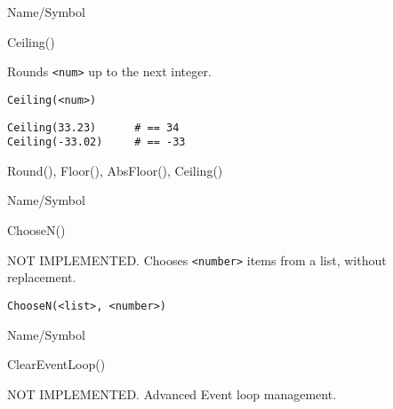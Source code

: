 \rl




\begin{desc}{Name/Symbol}
\item[Name/Symbol]  	Ceiling()

\item[Description] 	Rounds \verb+<num>+ up to the next integer.

\item[Usage]
\begin{verbatim}
Ceiling(<num>)
\end{verbatim}

\item[Example] 
\begin{verbatim}
Ceiling(33.23)  	# == 34
Ceiling(-33.02) 	# == -33
\end{verbatim}

\item[See Also]     	Round(), Floor(), AbsFloor(), Ceiling()
\end{desc}

\rl


\begin{desc}{Name/Symbol}
\item[Name/Symbol]  	ChooseN()

\item[Description] 	NOT IMPLEMENTED.  Chooses \verb+<number>+ items from a list, without replacement.

\item[Usage] 
\begin{verbatim}
ChooseN(<list>, <number>)
\end{verbatim}

\item[Example]	

\item[See Also]	
\end{desc}

\rl




\begin{desc}{Name/Symbol}
\item[Name/Symbol]  	ClearEventLoop()

\item[Description]  	NOT IMPLEMENTED. Advanced Event loop management.

\item[Usage]		

\item[Example]	

\item[See Also]	
\end{desc}

